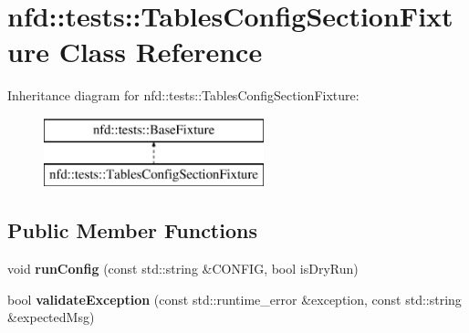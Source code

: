 \hypertarget{classnfd_1_1tests_1_1TablesConfigSectionFixture}{}\section{nfd\+:\+:tests\+:\+:Tables\+Config\+Section\+Fixture Class Reference}
\label{classnfd_1_1tests_1_1TablesConfigSectionFixture}
Inheritance diagram for nfd\+:\+:tests\+:\+:Tables\+Config\+Section\+Fixture\+:\begin{figure}[H]
\begin{center}
\leavevmode
\includegraphics[height=2.000000cm]{classnfd_1_1tests_1_1TablesConfigSectionFixture}
\end{center}
\end{figure}
\subsection*{Public Member Functions}
\begin{DoxyCompactItemize}
\item 
void {\bfseries run\+Config} (const std\+::string \&C\+O\+N\+F\+IG, bool is\+Dry\+Run)\hypertarget{classnfd_1_1tests_1_1TablesConfigSectionFixture_ae4190895b05ae35a5c7c0c4b15c1a775}{}\label{classnfd_1_1tests_1_1TablesConfigSectionFixture_ae4190895b05ae35a5c7c0c4b15c1a775}

\item 
bool {\bfseries validate\+Exception} (const std\+::runtime\+\_\+error \&exception, const std\+::string \&expected\+Msg)\hypertarget{classnfd_1_1tests_1_1TablesConfigSectionFixture_a9733765fba21b97f6bc9e7b6fa093787}{}\label{classnfd_1_1tests_1_1TablesConfigSectionFixture_a9733765fba21b97f6bc9e7b6fa093787}

\end{DoxyCompactItemize}
